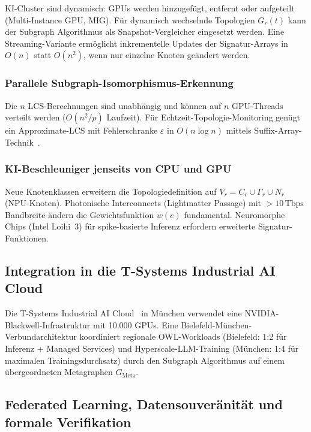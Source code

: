 ﻿\documentclass[a4paper,12pt]{article}
\theoremstyle{definition}
\begin{document}
KI-Cluster sind dynamisch: GPUs werden hinzugef\"{u}gt, entfernt oder aufgeteilt (Multi-Instance GPU, MIG). F\"{u}r dynamisch wechselnde Topologien $G_r(t)$ kann der Subgraph Algorithmus als Snapshot-Vergleicher eingesetzt werden. Eine Streaming-Variante erm\"{o}glicht inkrementelle Updates der Signatur-Arrays in $O(n)$ statt $O(n^2)$, wenn nur einzelne Knoten ge\"{a}ndert werden.

\subsubsection{Parallele Subgraph-Isomorphismus-Erkennung}

Die $n$ LCS-Berechnungen sind unabh\"{a}ngig und k\"{o}nnen auf $n$ GPU-Threads verteilt werden ($O(n^2/p)$ Laufzeit). F\"{u}r Echtzeit-Topologie-Monitoring gen\"{u}gt ein Approximate-LCS mit Fehlerschranke $\varepsilon$ in $O(n \log n)$ mittels Suffix-Array-Technik~\cite{navarro2001approx}.

\subsubsection{KI-Beschleuniger jenseits von CPU und GPU}

Neue Knotenklassen erweitern die Topologiedefinition auf $V_r = C_r \cup \Gamma_r \cup N_r$ (NPU-Knoten). Photonische Interconnects (Lightmatter Passage) mit $>10\,\text{Tbps}$ Bandbreite \"{a}ndern die Gewichtsfunktion $w(e)$ fundamental. Neuromorphe Chips (Intel Loihi~3) f\"{u}r spike-basierte Inferenz erfordern erweiterte Signatur-Funktionen.

\subsection{Integration in die T-Systems Industrial AI Cloud}

Die T-Systems Industrial AI Cloud~\cite{tsystems2026iac} in M\"{u}nchen verwendet eine NVIDIA-Blackwell-Infrastruktur mit 10.000 GPUs.
Eine Bielefeld-M\"{u}nchen-Verbundarchitektur koordiniert regionale OWL-Workloads (Bielefeld: 1:2 f\"{u}r Inferenz + Managed Services) und Hyperscale-LLM-Training (M\"{u}nchen: 1:4 f\"{u}r maximalen Trainingsdurchsatz) durch den Subgraph Algorithmus auf einem \"{u}bergeordneten Metagraphen $G_{\text{Meta}}$.

\subsection{Federated Learning, Datensouver\"{a}nit\"{a}t und formale Verifikation}
\end{document}

